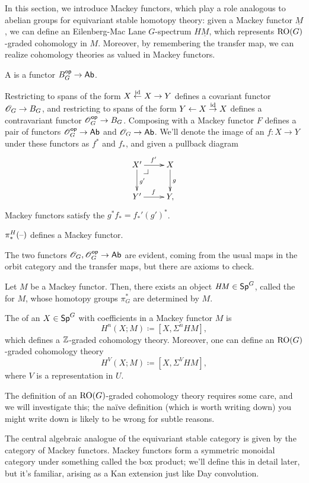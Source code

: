 In this section, we introduce Mackey functors, which play a role analogous to abelian groups for equivariant stable
homotopy theory: given a Mackey functor $\underline M$, we can define an Eilenberg-Mac Lane $G$-spectrum
$H\underline M$, which represents $\mathrm{RO}(G)$-graded cohomology in $M$. Moreover, by remembering the transfer map, we
can realize cohomology theories as valued in Mackey functors.
\begin{defn}
A  is a functor $B_G^{\mathsf{op}}\to\mathsf{Ab}$.
\end{defn}
Restricting to spans of the form $X\stackrel{\mathrm{id}}\gets X\to Y$ defines a covariant functor
$\mathscr O_G\to B_G$, and restricting to spans of the form $Y\gets X\stackrel{\mathrm{id}}\to X$ defines a contravariant functor
$\mathscr O_G^{\mathsf{op}}\to B_G$. Composing with a Mackey functor $F$ defines a pair of functors $\mathscr O_G^{\mathsf{op}}\to\mathsf{Ab}$ and
$\mathscr O_G\to\mathsf{Ab}$. We'll denote the image of an $f\colon X\to Y$ under these functors as $f^*$ and $f_*$, and given a
pullback diagram
\[\xymatrix{
	X'\ar[r]^{f'}\ar[d]^{g'}\pushoutcorner & X\ar[d]^g\\
	Y'\ar[r]^f & Y,
}\]
Mackey functors satisfy the  $g^*f_* = f_*'(g')^*$.
\begin{prop}
$\pi_*^H(\text{--})$ defines a Mackey functor.
\end{prop}
The two functors $\mathscr O_G,\mathscr O_G^{\mathsf{op}}\to\mathsf{Ab}$ are evident, coming from the usual maps in the orbit category and the
transfer maps, but there are axioms to check.

Let $M$ be a Mackey functor. Then, there exists an object $\mathit{HM}\in\mathsf{Sp}^G$, called the  for $M$, whose homotopy groups $\pi_G^*$ are determined by $M$.
\begin{defn}
The  of an $X\in\mathsf{Sp}^G$ with coefficients in a Mackey functor $M$ is
\[H^n(X;M)\coloneqq [X, \Sigma^n \mathit{HM}],\]
which defines a $\mathbb Z$-graded cohomology theory. Moreover, one can define an $\mathrm{RO}(G)$-graded cohomology theory
\[H^V(X;M)\coloneqq [X, \Sigma^V \mathit{HM}],\]
where $V$ is a representation in $U$.
\end{defn}
The definition of an $\mathrm{RO}(G)$-graded cohomology theory requires some care, and we will investigate this; the naïve
definition (which is worth writing down) you might write down is likely to be wrong for subtle reasons.

The central algebraic analogue of the equivariant stable category is given by the category of Mackey functors.
Mackey functors form a symmetric monoidal category under something called the box product; we'll define this in
detail later, but it's familiar, arising as a Kan extension just like Day convolution.

